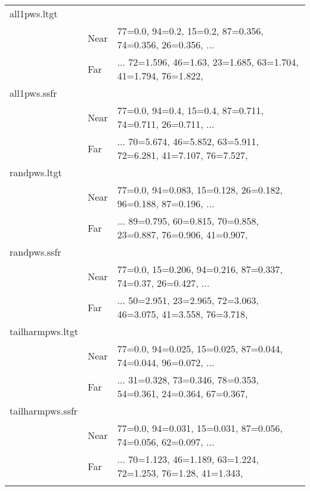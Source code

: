 \begin{longtable}{l l l}all1pws.ltgt\\ 
 & Near & 77=0.0, 94=0.2, 15=0.2, 87=0.356, 74=0.356, 26=0.356,  ...\\
 & Far & ... 72=1.596, 46=1.63, 23=1.685, 63=1.704, 41=1.794, 76=1.822,  \\
\hline
\hline
\smallskip
all1pws.ssfr\\ 
 & Near & 77=0.0, 94=0.4, 15=0.4, 87=0.711, 74=0.711, 26=0.711,  ...\\
 & Far & ... 70=5.674, 46=5.852, 63=5.911, 72=6.281, 41=7.107, 76=7.527,  \\
\hline
\hline
\smallskip
randpws.ltgt\\ 
 & Near & 77=0.0, 94=0.083, 15=0.128, 26=0.182, 96=0.188, 87=0.196,  ...\\
 & Far & ... 89=0.795, 60=0.815, 70=0.858, 23=0.887, 76=0.906, 41=0.907,  \\
\hline
\hline
\smallskip
randpws.ssfr\\ 
 & Near & 77=0.0, 15=0.206, 94=0.216, 87=0.337, 74=0.37, 26=0.427,  ...\\
 & Far & ... 50=2.951, 23=2.965, 72=3.063, 46=3.075, 41=3.558, 76=3.718,  \\
\hline
\hline
\smallskip
tailharmpws.ltgt\\ 
 & Near & 77=0.0, 94=0.025, 15=0.025, 87=0.044, 74=0.044, 96=0.072,  ...\\
 & Far & ... 31=0.328, 73=0.346, 78=0.353, 54=0.361, 24=0.364, 67=0.367,  \\
\hline
\hline
\smallskip
tailharmpws.ssfr\\ 
 & Near & 77=0.0, 94=0.031, 15=0.031, 87=0.056, 74=0.056, 62=0.097,  ...\\
 & Far & ... 70=1.123, 46=1.189, 63=1.224, 72=1.253, 76=1.28, 41=1.343,  \\
\hline
\hline
\smallskip
\end{longtable}

